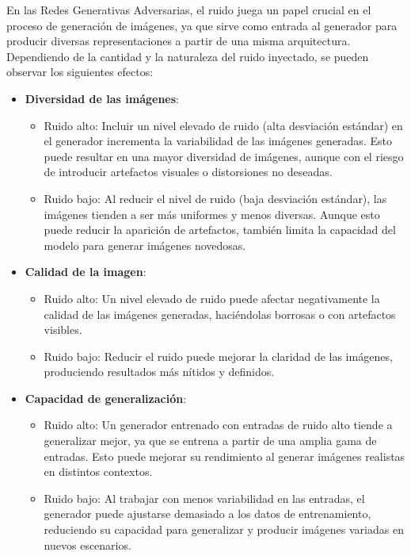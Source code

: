 En las Redes Generativas Adversarias, el ruido juega un papel crucial en el proceso de generación de imágenes, ya que sirve como entrada al generador para producir diversas representaciones a partir de una misma arquitectura. Dependiendo de la cantidad y la naturaleza del ruido inyectado, se pueden observar los siguientes efectos:
\begin{itemize}
    \item \textbf{Diversidad de las imágenes}:
    \begin{itemize}
        \item Ruido alto: Incluir un nivel elevado de ruido (alta desviación estándar) en el generador incrementa la variabilidad de las imágenes generadas. Esto puede resultar en una mayor diversidad de imágenes, aunque con el riesgo de introducir artefactos visuales o distorsiones no deseadas.
        \item Ruido bajo: Al reducir el nivel de ruido (baja desviación estándar), las imágenes tienden a ser más uniformes y menos diversas. Aunque esto puede reducir la aparición de artefactos, también limita la capacidad del modelo para generar imágenes novedosas.
    \end{itemize}
    
    \item \textbf{Calidad de la imagen}:
    \begin{itemize}
        \item Ruido alto: Un nivel elevado de ruido puede afectar negativamente la calidad de las imágenes generadas, haciéndolas borrosas o con artefactos visibles.
        \item Ruido bajo: Reducir el ruido puede mejorar la claridad de las imágenes, produciendo resultados más nítidos y definidos.
    \end{itemize}
    
    \item \textbf{Capacidad de generalización}:
    \begin{itemize}
        \item Ruido alto: Un generador entrenado con entradas de ruido alto tiende a generalizar mejor, ya que se entrena a partir de una amplia gama de entradas. Esto puede mejorar su rendimiento al generar imágenes realistas en distintos contextos.
        \item Ruido bajo: Al trabajar con menos variabilidad en las entradas, el generador puede ajustarse demasiado a los datos de entrenamiento, reduciendo su capacidad para generalizar y producir imágenes variadas en nuevos escenarios.
    \end{itemize}


\end{itemize}
